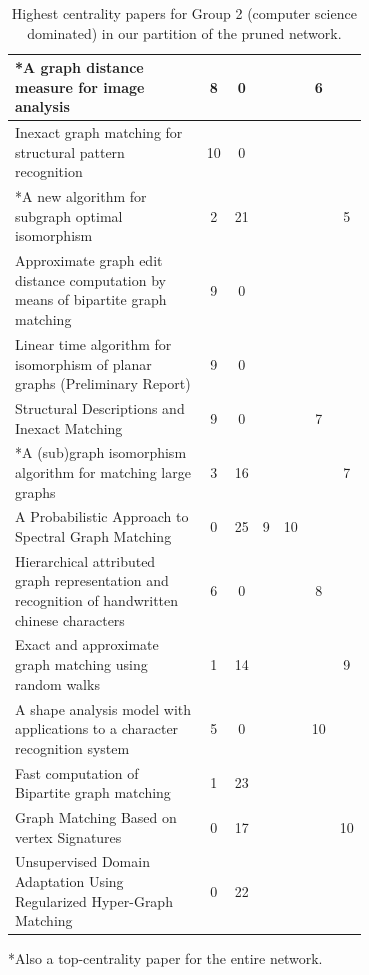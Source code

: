 \documentclass[12pt]{thesis}
\theoremstyle{plain}
\theoremstyle{definition}
\theoremstyle{remark}
\begin{document}
\begin{table}[H]
{\begin{tabular}{|L{0.7\linewidth}|c|c|c|c|c|c|}
*A graph distance measure for image analysis & 8 & 0 &  &  & 6 &  \\ \hline
Inexact graph matching for structural pattern recognition & 10 & 0 &  &  &  &  \\ \hline
*A new algorithm for subgraph optimal isomorphism & 2 & 21 &  &  &  & 5 \\ \hline
Approximate graph edit distance computation by means of bipartite graph matching & 9 & 0 &  &  &  &  \\ \hline
Linear time algorithm for isomorphism of planar graphs (Preliminary Report) & 9 & 0 &  &  &  &  \\ \hline
Structural Descriptions and Inexact Matching & 9 & 0 &  &  & 7 &  \\ \hline
*A (sub)graph isomorphism algorithm for matching large graphs & 3 & 16 &  &  &  & 7 \\ \hline
A Probabilistic Approach to Spectral Graph Matching & 0 & 25 & 9 & 10 &  &  \\ \hline
Hierarchical attributed graph representation and recognition of handwritten chinese characters & 6 & 0 &  &  & 8 &  \\ \hline
Exact and approximate graph matching using random walks & 1 & 14 &  &  &  & 9 \\ \hline
A shape analysis model with applications to a character recognition system & 5 & 0 &  &  & 10 &  \\ \hline
Fast computation of Bipartite graph matching & 1 & 23 &  &  &  &  \\ \hline
Graph Matching Based on vertex Signatures & 0 & 17 &  &  &  & 10 \\ \hline
Unsupervised Domain Adaptation Using Regularized Hyper-Graph Matching & 0 & 22 &  &  &  &  \\ \hline
\end{tabular}
*Also a top-centrality paper for the entire network.}
\caption{Highest centrality papers for Group 2 (computer science dominated) in our partition of the pruned network.}
\label{tab:toppapers_CS}
\end{table}








\end{document}
